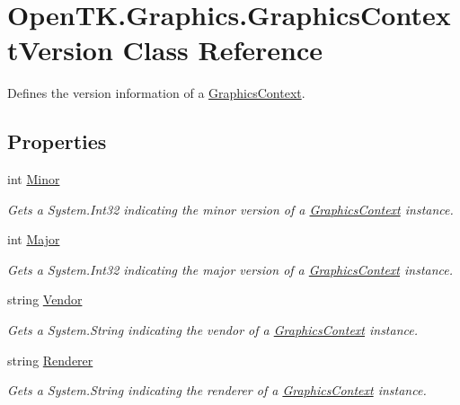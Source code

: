 \hypertarget{class_open_t_k_1_1_graphics_1_1_graphics_context_version}{\section{Open\-T\-K.\-Graphics.\-Graphics\-Context\-Version Class Reference}
\label{class_open_t_k_1_1_graphics_1_1_graphics_context_version}
}


Defines the version information of a \hyperlink{class_open_t_k_1_1_graphics_1_1_graphics_context}{Graphics\-Context}.  


\subsection*{Properties}
\begin{DoxyCompactItemize}
\item 
int \hyperlink{class_open_t_k_1_1_graphics_1_1_graphics_context_version_a66ad81b880edae4f65c9f3b7eeba6c53}{Minor}
\begin{DoxyCompactList}\small\item\em Gets a System.\-Int32 indicating the minor version of a \hyperlink{class_open_t_k_1_1_graphics_1_1_graphics_context}{Graphics\-Context} instance. \end{DoxyCompactList}\item 
int \hyperlink{class_open_t_k_1_1_graphics_1_1_graphics_context_version_abe76536cbbf5c6d06280a3508409af1f}{Major}
\begin{DoxyCompactList}\small\item\em Gets a System.\-Int32 indicating the major version of a \hyperlink{class_open_t_k_1_1_graphics_1_1_graphics_context}{Graphics\-Context} instance. \end{DoxyCompactList}\item 
string \hyperlink{class_open_t_k_1_1_graphics_1_1_graphics_context_version_a6dc72d3aa4db44e3b6199135850e4a51}{Vendor}
\begin{DoxyCompactList}\small\item\em Gets a System.\-String indicating the vendor of a \hyperlink{class_open_t_k_1_1_graphics_1_1_graphics_context}{Graphics\-Context} instance. \end{DoxyCompactList}\item 
string \hyperlink{class_open_t_k_1_1_graphics_1_1_graphics_context_version_a66cf8e69e2b891b0f41f92871fc6c03a}{Renderer}
\begin{DoxyCompactList}\small\item\em Gets a System.\-String indicating the renderer of a \hyperlink{class_open_t_k_1_1_graphics_1_1_graphics_context}{Graphics\-Context} instance. \end{DoxyCompactList}\end{DoxyCompactItemize}


